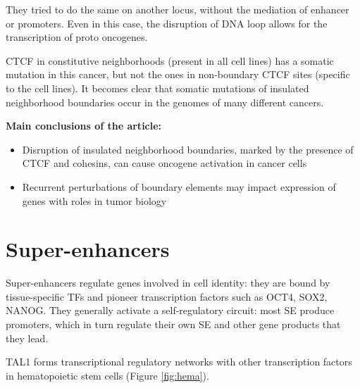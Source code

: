 They tried to do the same on another locus, without the mediation of enhancer or promoters. Even in this case,  the disruption of DNA loop allows for the transcription of proto oncogenes.

CTCF in constitutive neighborhoods (present in all cell lines) has a somatic mutation in this cancer, but not the ones in non-boundary CTCF sites (specific to the cell lines). It becomes clear that somatic mutations of insulated neighborhood boundaries occur in the genomes of many different cancers.

\textbf{Main conclusions of the article:}
\begin{itemize}
\item Disruption of insulated neighborhood boundaries, marked by the presence of CTCF and cohesins,
can cause oncogene activation in cancer cells
\item Recurrent perturbations of boundary elements may impact expression of genes with roles in
tumor biology
\end{itemize}

\hypertarget{super-enhancers}{%
\section{Super-enhancers}\label{super-enhancers}}

Super-enhancers regulate genes involved in cell identity: they are bound by tissue-specific TFs and pioneer transcription factors such as OCT4, SOX2, NANOG. They generally activate a self-regulatory circuit: most SE produce promoters, which in turn regulate their own SE and other gene products that they lead.

TAL1 forms transcriptional regulatory networks with other transcription factors in hematopoietic stem cells (Figure \ref{fig:hema}).

